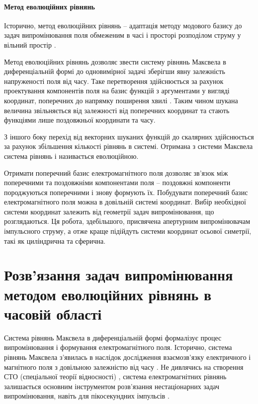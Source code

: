 \paragraph{Метод еволюційних рівнянь}

Історично, метод еволюційних рівнянь -- адаптація методу модового базису 
\cite{imp:Tretyakov1986} до задач випромінювання поля обмеженим в часі і 
просторі розподілом струму у вільний простір \cite{imp:Tretyakov2004}.

Метод еволюційних рівнянь дозволяє звести систему рівнянь Максвела в 
диференціальній формі до одновимірної задачі зберігши явну залежність 
напруженості поля від часу. Таке перетворення здійснюється за рахунок 
проектування компонентів поля на базис функцій з аргументами у вигляді 
координат, поперечних до напрямку поширення хвилі \cite{imp:Dumin2010}. 
Таким чином шукана величина звільняється від залежності від поперечних 
координат та стають функціями лише поздовжньої координати та часу.

З іншого боку перехід від векторних шуканих функцій до скалярних здійснюється
за рахунок збільшення кількості рівнянь в системі. Отримана з системи Максвела
система рівнянь і називається еволюційною.

Отримати поперечний базис електромагнітного поля дозволяє зв'язок між 
поперечними та поздовжніми компонентами поля -- поздовжні компоненти 
породжуються поперечними і знову формують їх. 
Побудувати поперечний базис електромагнітного поля можна в довільній системі 
координат. Вибір необхідної системи координат залежить від геометрії задач 
випромінювання, що розглядаються. Ця робота, здебільшого, присвячена 
апертурним випромінювачам імпульсного струму, а отже краще підійдуть 
системи координат осьової симетрії, такі як циліндрична та сферична.

\section{Розв'язання задач випромінювання методом еволюційних рівнянь
в часовій області}

Система рівнянь Максвела в диференціальній формі формалізує процес
випромінювання і формування електромагнітного поля. Історично, система рівнянь 
Максвела з'явилась в наслідок дослідження взаємозв'язку електричного і 
магнітного поля з довільною залежністю від часу \cite{imp:Maxwell1865}.
Не дивлячись на створення СТО (спеціальної теорії відносності) 
\cite{imp:Einstein1905}, система електромагнітних рівнянь залишається основним
інструментом розв'язання нестаціонарних задач випромінювання, навіть для 
пікосекундних імпульсів \cite{imp:Bray2006}.

